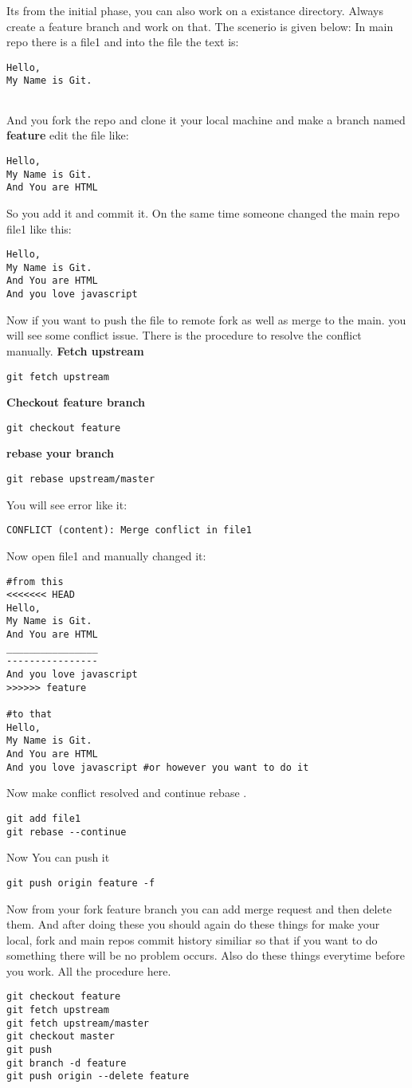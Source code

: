 \documentclass{article}
\begin{document}
Its from the initial phase, you can also work on a existance directory. 
Always create a feature branch and work on that. The scenerio is given below:
In main repo there is a file1 and into the file the text is: 
\begin{lstlisting}
Hello,
My Name is Git. 
	
\end{lstlisting}
And you fork the repo and clone it your local machine and make a branch named \textbf{feature} edit the file like:
\begin{lstlisting}
Hello,
My Name is Git. 
And You are HTML 
\end{lstlisting}
So you add it and commit it. On the same time someone changed the main repo file1 like this:
\begin{lstlisting}
Hello,
My Name is Git. 
And You are HTML
And you love javascript
\end{lstlisting}
Now if you want to push the file to remote fork as well as merge to the main. you will see some conflict issue. There is the procedure to resolve the conflict manually. 
\textbf{Fetch upstream}
\begin{lstlisting}
git fetch upstream
\end{lstlisting}
\textbf{Checkout feature branch}
\begin{lstlisting}
git checkout feature
\end{lstlisting}
\textbf{rebase your branch}
\begin{lstlisting}
git rebase upstream/master 
\end{lstlisting}
You will see error like it:
\begin{lstlisting}
CONFLICT (content): Merge conflict in file1
\end{lstlisting}
Now open file1 and manually changed it: 
\begin{lstlisting}
#from this 
<<<<<<< HEAD 
Hello,
My Name is Git. 
And You are HTML
________________
----------------
And you love javascript
>>>>>> feature 

#to that 
Hello,
My Name is Git. 
And You are HTML
And you love javascript #or however you want to do it
\end{lstlisting}
Now make conflict resolved and continue rebase . 
\begin{lstlisting}
git add file1
git rebase --continue
\end{lstlisting}
Now You can push it 
\begin{lstlisting}
git push origin feature -f 	
\end{lstlisting}

Now from your fork feature branch you can add merge request and then delete
them.
And after doing these you should again do these things for make your local, fork and main repos commit history similiar so that if you want to do something there will be no problem occurs. Also do these things everytime before you work. All the procedure here. 
\begin{lstlisting}
git checkout feature
git fetch upstream
git fetch upstream/master
git checkout master
git push  
git branch -d feature
git push origin --delete feature 
\end{lstlisting}
\end{document}
